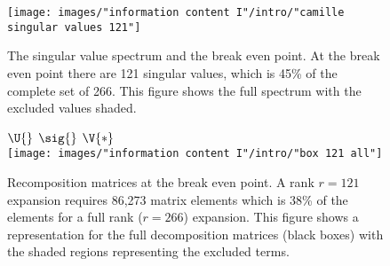 \begin{figure}[htbp]
   \centering
   \texttt{[image: images/"information content I"/intro/"camille singular values 121"]} 
   \caption[The singular value spectrum and the break even point]{The singular value spectrum and the break even point. At the break even point there are 121 singular values, which is 45\% of the complete set of 266. This figure shows the full spectrum with the excluded values shaded.}
   \label{fig:break even:spectrum}
\end{figure}
\begin{figure}[htbp]
   \centering
   $\U{}$ \qquad \qquad \qquad \qquad \qquad $\sig{}$ \qquad \qquad \qquad \qquad \qquad  $\V{*}$ \\
   \texttt{[image: images/"information content I"/intro/"box 121 all"]}
   \caption[Recomposition matrices at the break even point]{Recomposition matrices at the break even point. A rank $r = 121$ expansion requires 86,273 matrix elements which is 38\% of the elements for a full rank ($r = 266$) expansion. This figure shows a representation for the full decomposition matrices (black boxes) with the shaded regions representing the excluded terms.}
   \label{fig:example}
\end{figure}

\endinput